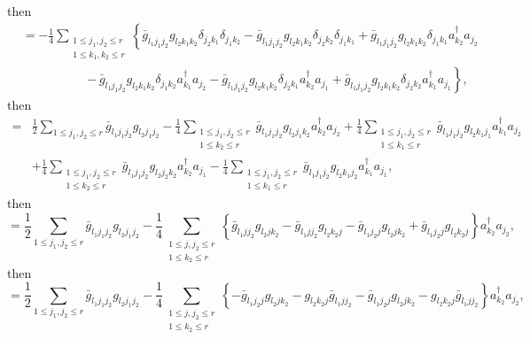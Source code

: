 \documentclass[aps,preprint]{revtex4}%
\begin{document}
then%
\begin{align}
&  =-\frac{1}{4}\sum_{\substack{1\leq j_{1},j_{2}\leq r\\1\leq k_{1},k_{2}\leq
r}}\left\{  \bar{g}_{l_{1}j_{1}j_{2}}g_{l_{2}k_{1}k_{2}}\delta_{j_{2}k_{1}%
}\delta_{j_{1}k_{2}}-\bar{g}_{l_{1}j_{1}j_{2}}g_{l_{2}k_{1}k_{2}}\delta
_{j_{2}k_{2}}\delta_{j_{1}k_{1}}+\bar{g}_{l_{1}j_{1}j_{2}}g_{l_{2}k_{1}k_{2}%
}\delta_{j_{1}k_{1}}a_{k_{2}}^{\dagger}a_{j_{2}}\right. \\
&  \left.  \qquad\qquad\right.  \left.  \quad-\bar{g}_{l_{1}j_{1}j_{2}%
}g_{l_{2}k_{1}k_{2}}\delta_{j_{1}k_{2}}a_{k_{1}}^{\dagger}a_{j_{2}}-\bar
{g}_{l_{1}j_{1}j_{2}}g_{l_{2}k_{1}k_{2}}\delta_{j_{2}k_{1}}a_{k_{2}}^{\dagger
}a_{j_{1}}+\bar{g}_{l_{1}j_{1}j_{2}}g_{l_{2}k_{1}k_{2}}\delta_{j_{2}k_{2}%
}a_{k_{1}}^{\dagger}a_{j_{1}}\right\}  ,
\end{align}
then%
\begin{align}
=  &  \frac{1}{2}\sum_{1\leq j_{1},j_{2}\leq r}\bar{g}_{l_{1}j_{1}j_{2}%
}g_{l_{2}j_{1}j_{2}}-\frac{1}{4}\sum_{\substack{1\leq j_{1},j_{2}\leq r\\1\leq
k_{2}\leq r}}\bar{g}_{l_{1}j_{1}j_{2}}g_{l_{2}j_{1}k_{2}}a_{k_{2}}^{\dagger
}a_{j_{2}}+\frac{1}{4}\sum_{\substack{1\leq j_{1},j_{2}\leq r\\1\leq k_{1}\leq
r}}\bar{g}_{l_{1}j_{1}j_{2}}g_{l_{2}k_{1}j_{1}}a_{k_{1}}^{\dagger}a_{j_{2}}\\
&  +\frac{1}{4}\sum_{\substack{1\leq j_{1},j_{2}\leq r\\1\leq k_{2}\leq
r}}\bar{g}_{l_{1}j_{1}j_{2}}g_{l_{2}j_{2}k_{2}}a_{k_{2}}^{\dagger}a_{j_{1}%
}-\frac{1}{4}\sum_{\substack{1\leq j_{1},j_{2}\leq r\\1\leq k_{1}\leq r}%
}\bar{g}_{l_{1}j_{1}j_{2}}g_{l_{2}k_{1}j_{2}}a_{k_{1}}^{\dagger}a_{j_{1}},
\end{align}
then
\begin{equation}
=\frac{1}{2}\sum_{1\leq j_{1},j_{2}\leq r}\bar{g}_{l_{1}j_{1}j_{2}}%
g_{l_{2}j_{1}j_{2}}-\frac{1}{4}\sum_{\substack{1\leq j,j_{2}\leq r\\1\leq
k_{2}\leq r}}\left\{  \bar{g}_{l_{1}jj_{2}}g_{l_{2}jk_{2}}-\bar{g}%
_{l_{1}jj_{2}}g_{l_{2}k_{2}j}-\bar{g}_{l_{1}j_{2}j}g_{l_{2}jk_{2}}+\bar
{g}_{l_{1}j_{2}j}g_{l_{2}k_{2}j}\right\}  a_{k_{2}}^{\dagger}a_{j_{2}},
\end{equation}
then%
\begin{equation}
=\frac{1}{2}\sum_{1\leq j_{1},j_{2}\leq r}\bar{g}_{l_{1}j_{1}j_{2}}%
g_{l_{2}j_{1}j_{2}}-\frac{1}{4}\sum_{\substack{1\leq j,j_{2}\leq r\\1\leq
k_{2}\leq r}}\left\{  -\bar{g}_{l_{1}j_{2}j}g_{l_{2}jk_{2}}-g_{l_{2}k_{2}%
j}\bar{g}_{l_{1}jj_{2}}-\bar{g}_{l_{1}j_{2}j}g_{l_{2}jk_{2}}-g_{l_{2}k_{2}%
j}\bar{g}_{l_{1}jj_{2}}\right\}  a_{k_{2}}^{\dagger}a_{j_{2}},
\end{equation}
\end{document}
